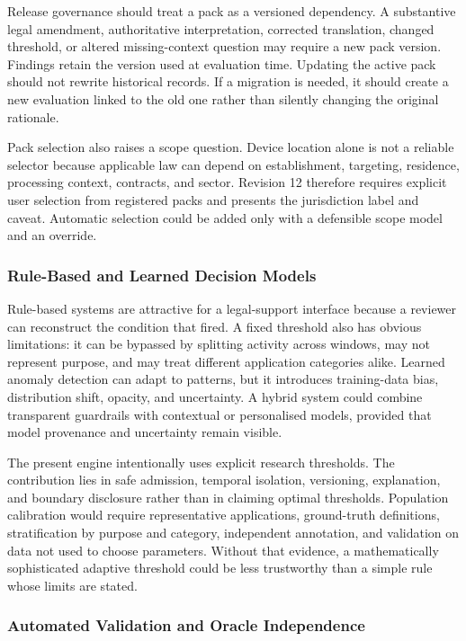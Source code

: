 Release governance should treat a pack as a versioned dependency. A substantive legal amendment, authoritative interpretation, corrected translation, changed threshold, or altered missing-context question may require a new pack version. Findings retain the version used at evaluation time. Updating the active pack should not rewrite historical records. If a migration is needed, it should create a new evaluation linked to the old one rather than silently changing the original rationale.

Pack selection also raises a scope question. Device location alone is not a reliable selector because applicable law can depend on establishment, targeting, residence, processing context, contracts, and sector. Revision 12 therefore requires explicit user selection from registered packs and presents the jurisdiction label and caveat. Automatic selection could be added only with a defensible scope model and an override.

\subsubsection{Rule-Based and Learned Decision Models}

Rule-based systems are attractive for a legal-support interface because a reviewer can reconstruct the condition that fired. A fixed threshold also has obvious limitations: it can be bypassed by splitting activity across windows, may not represent purpose, and may treat different application categories alike. Learned anomaly detection can adapt to patterns, but it introduces training-data bias, distribution shift, opacity, and uncertainty. A hybrid system could combine transparent guardrails with contextual or personalised models, provided that model provenance and uncertainty remain visible.

The present engine intentionally uses explicit research thresholds. The contribution lies in safe admission, temporal isolation, versioning, explanation, and boundary disclosure rather than in claiming optimal thresholds. Population calibration would require representative applications, ground-truth definitions, stratification by purpose and category, independent annotation, and validation on data not used to choose parameters. Without that evidence, a mathematically sophisticated adaptive threshold could be less trustworthy than a simple rule whose limits are stated.

\subsubsection{Automated Validation and Oracle Independence}

